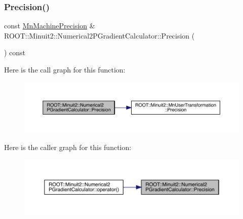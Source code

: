 \mbox{\label{classROOT_1_1Minuit2_1_1Numerical2PGradientCalculator_a661d6dcac5eeb09c36d9b64829f0448c}} 
\subsubsection{\texorpdfstring{Precision()}{Precision()}\hspace{0.1cm}{\footnotesize\ttfamily [2/2]}}
{\footnotesize\ttfamily const \mbox{\hyperlink{classROOT_1_1Minuit2_1_1MnMachinePrecision}{Mn\+Machine\+Precision}} \& R\+O\+O\+T\+::\+Minuit2\+::\+Numerical2\+P\+Gradient\+Calculator\+::\+Precision (\begin{DoxyParamCaption}{ }\end{DoxyParamCaption}) const}

Here is the call graph for this function\+:\nopagebreak
\begin{figure}[H]
\begin{center}
\leavevmode
\includegraphics[width=350pt]{d0/d82/classROOT_1_1Minuit2_1_1Numerical2PGradientCalculator_a661d6dcac5eeb09c36d9b64829f0448c_cgraph}
\end{center}
\end{figure}
Here is the caller graph for this function\+:\nopagebreak
\begin{figure}[H]
\begin{center}
\leavevmode
\includegraphics[width=350pt]{d0/d82/classROOT_1_1Minuit2_1_1Numerical2PGradientCalculator_a661d6dcac5eeb09c36d9b64829f0448c_icgraph}
\end{center}
\end{figure}
\mbox{\label{classROOT_1_1Minuit2_1_1Numerical2PGradientCalculator_afb1bbda7e079db02b02b790e0b0f6cca}} 

